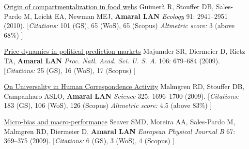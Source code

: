 \NumberedItem{\makebox[0.8cm][r]{[86]}}
\href{/people/amaral/origin-compartmentalization-food-webs}
{Origin of compartmentalization in food webs}
\newline
Guimer\`a R, Stouffer DB, Sales-Pardo M, Leicht EA, Newman MEJ, {\textbf{Amaral LAN}}
\newline
\textit{Ecology}
    91:
2941--2951 (2010).
    \newline
    \hfill [{\em{Citations:}} 101 (GS),
    65 (WoS), 65 (Scopus)
        {\hspace*{1cm} \em{Altmetric score:}}  3 (above 68\%)
    ]
\newline
\Gap
~
\Gap

\NumberedItem{\makebox[0.8cm][r]{[85]}}
\href{/people/amaral/price-dynamics-in-political-prediction-markets}
{Price dynamics in political prediction markets}
\newline
Majumder SR, Diermeier D, Rietz TA, {\textbf{Amaral LAN}}
\newline
\textit{Proc. Natl. Acad. Sci. U. S. A.}
    106:
679--684 (2009).
    \newline
    \hfill [{\em{Citations:}} 25 (GS),
    16 (WoS), 17 (Scopus)
    ]
\newline
\Gap
~
\Gap

\NumberedItem{\makebox[0.8cm][r]{[84]}}
\href{/people/amaral/universality-human-correspondence-activity}
{On Universality in Human Correspondence Activity}
\newline
Malmgren RD, Stouffer DB, Campanharo ASLO, {\textbf{Amaral LAN}}
\newline
\textit{Science}
    325:
1696--1700 (2009).
    \newline
    \hfill [{\em{Citations:}} 183 (GS),
    106 (WoS), 126 (Scopus)
        {\hspace*{1cm} \em{Altmetric score:}}  4.5 (above 83\%)
    ]
\newline
\Gap
~
\Gap

\NumberedItem{\makebox[0.8cm][r]{[83]}}
\href{/people/amaral/micro-bias-and-macro-performance}
{Micro-bias and macro-performance}
\newline
Seaver SMD, Moreira AA, Sales-Pardo M, Malmgren RD, Diermeier D, {\textbf{Amaral LAN}}
\newline
\textit{European Physical Journal B}
    67:
369--375 (2009).
    \newline
    \hfill [{\em{Citations:}} 6 (GS),
    3 (WoS), 4 (Scopus)
    ]
\newline
\Gap
~
\Gap


